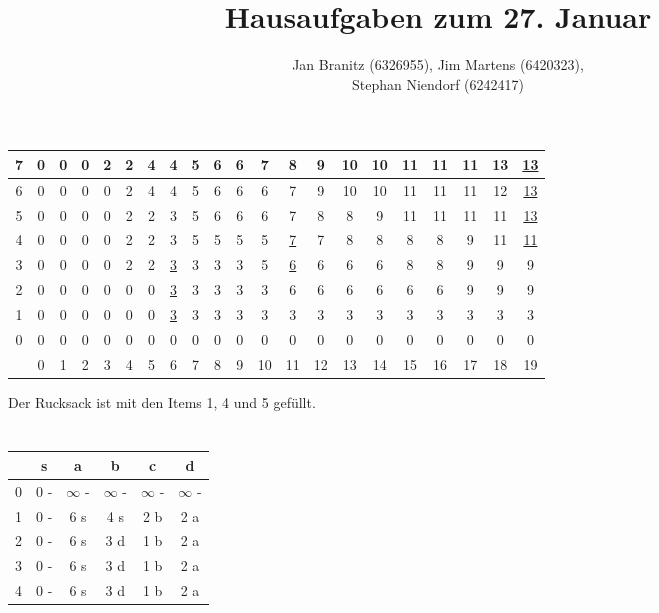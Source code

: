 \documentclass[10pt,a4paper,oneside,ngerman,numbers=noenddot]{scrartcl}
\begin{document}
\author{Jan Branitz (6326955), Jim Martens (6420323),\\
Stephan Niendorf (6242417)}
\title{Hausaufgaben zum 27. Januar}
\maketitle

\section{} %
	\begin{tabular}{|c||c|c|c|c|c|c|c|c|c|c|c|c|c|c|c|c|c|c|c|c|}
		\hline
		7 & 0 & 0 & 0 & 2 & 2 & 4 & 4 & 5 & 6 & 6 & 7 & 8 & 9 & 10 & 10 & 11 & 11 & 11 & 13 & \underline{13} \\
		\hline
		6 & 0 & 0 & 0 & 0 & 2 & 4 & 4 & 5 & 6 & 6 & 6 & 7 & 9 & 10 & 10 & 11 & 11 & 11 & 12 & \underline{13} \\
		\hline
		5 & 0 & 0 & 0 & 0 & 2 & 2 & 3 & 5 & 6 & 6 & 6 & 7 & 8 & 8 & 9 & 11 & 11 & 11 & 11 & \underline{13} \\
		\hline
		4 & 0 & 0 & 0 & 0 & 2 & 2 & 3 & 5 & 5 & 5 & 5 & \underline{7} & 7 & 8 & 8 & 8 & 8 & 9 & 11 & \underline{11} \\
		\hline
		3 & 0 & 0 & 0 & 0 & 2 & 2 & \underline{3} & 3 & 3 & 3 & 5 & \underline{6} & 6 & 6 & 6 & 8 & 8 & 9 & 9 & 9 \\
		\hline
		2 & 0 & 0 & 0 & 0 & 0 & 0 & \underline{3} & 3 & 3 & 3 & 3 & 6 & 6 & 6 & 6 & 6 & 6 & 9 & 9 & 9 \\
		\hline
		1 & 0 & 0 & 0 & 0 & 0 & 0 & \underline{3} & 3 & 3 & 3 & 3 & 3 & 3 & 3 & 3 & 3 & 3 & 3 & 3 & 3 \\
		\hline
		0 & 0 & 0 & 0 & 0 & 0 & 0 & 0 & 0 & 0 & 0 & 0 & 0 & 0 & 0 & 0 & 0 & 0 & 0 & 0 & 0 \\
		\hline
		\hline
		& 0 & 1 & 2 & 3 & 4 & 5 & 6 & 7 & 8 & 9 & 10 & 11 & 12 & 13 & 14 & 15 & 16 & 17 & 18 & 19 \\
		\hline
	\end{tabular}
	
	Der Rucksack ist mit den Items 1, 4 und 5 gefüllt.
\section{} %
	\begin{tabular}{c|c|c|c|c|c}
		& s & a & b & c & d \\
		\hline
		0 & 0 - & $\infty$ - & $\infty$ - & $\infty$ - & $\infty$ - \\
		1 & 0 - & 6 s & 4 s & 2 b & 2 a \\
		2 & 0 - & 6 s & 3 d & 1 b & 2 a \\
		3 & 0 - & 6 s & 3 d & 1 b & 2 a \\
		4 & 0 - & 6 s & 3 d & 1 b & 2 a
	\end{tabular}
\end{document}
